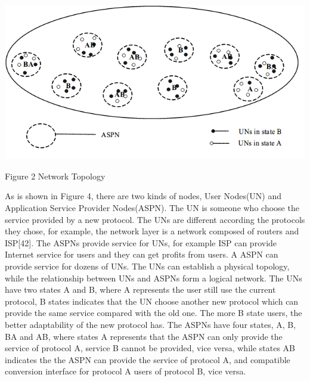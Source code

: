 \documentclass{article}
\begin{document}
\par
\centerline{\includegraphics[width=.5\textwidth]{Figure2.png}}
\centerline{Figure 2 Network Topology}

As is shown in Figure 4, there are two kinds of nodes, User Nodes(UN) and Application Service Provider Nodes(ASPN).
The UN is someone who choose the service provided by a new protocol. The UNs are different according the protocols
they chose, for example, the network layer is a network composed of routers and ISP[42]. The ASPNs provide service
for UNs, for example ISP can provide Internet service for users and they can get profits from users. A ASPN can provide
service for dozens of UNs. The UNs can establish a physical topology, while the relationship between UNs and ASPNs form
a logical network. The UNs have two states A and B, where A represents the user still use the current protocol, B states
indicates that the UN choose another new protocol which can provide the same service compared with the old one. The
more B state users, the better adaptability of the new protocol has. The ASPNs have four states, A, B, BA and AB,
where states A represents that the ASPN can only provide the service of protocol A, service B cannot be provided,
vice versa, while states AB indicates the the ASPN can provide the service of protocol A, and compatible conversion
interface for protocol A users of protocol B, vice versa.
\end{document}
